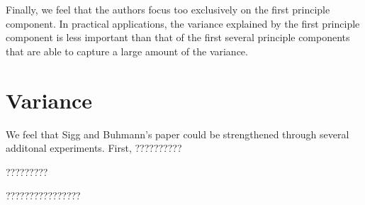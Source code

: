 \documentclass[twocolumn]{article}
\begin{document}
Finally, we feel that the authors focus too exclusively on
the first principle component.
In practical applications, the variance explained by the first
principle component is less important than that of the first
several principle components that are able to capture a large
amount of the variance.

\section{Variance}

We feel that Sigg and Buhmann's paper could be strengthened
through several additonal experiments. First, ??????????

?????????

????????????????
\end{document}
